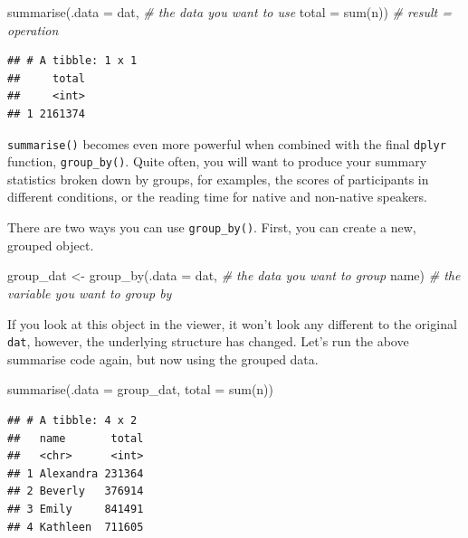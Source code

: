\documentclass[
  oneside]{book}
\newenvironment{Shaded}{\begin{snugshade}}{\end{snugshade}}
\newcommand{\AttributeTok}[1]{\textcolor[rgb]{0.77,0.63,0.00}{#1}}
\newcommand{\CommentTok}[1]{\textcolor[rgb]{0.56,0.35,0.01}{\textit{#1}}}
\newcommand{\FunctionTok}[1]{\textcolor[rgb]{0.00,0.00,0.00}{#1}}
\newcommand{\NormalTok}[1]{#1}
\newcommand{\OtherTok}[1]{\textcolor[rgb]{0.56,0.35,0.01}{#1}}
\begin{document}
\begin{Shaded}
\begin{Highlighting}[]
\FunctionTok{summarise}\NormalTok{(}\AttributeTok{.data =}\NormalTok{ dat, }\CommentTok{\# the data you want to use}
          \AttributeTok{total =} \FunctionTok{sum}\NormalTok{(n)) }\CommentTok{\# result = operation}
\end{Highlighting}
\end{Shaded}

\begin{verbatim}
## # A tibble: 1 x 1
##     total
##     <int>
## 1 2161374
\end{verbatim}

\texttt{summarise()} becomes even more powerful when combined with the final \texttt{dplyr} function, \texttt{group\_by()}. Quite often, you will want to produce your summary statistics broken down by groups, for examples, the scores of participants in different conditions, or the reading time for native and non-native speakers.

There are two ways you can use \texttt{group\_by()}. First, you can create a new, grouped object.

\begin{Shaded}
\begin{Highlighting}[]
\NormalTok{group\_dat }\OtherTok{\textless{}{-}} \FunctionTok{group\_by}\NormalTok{(}\AttributeTok{.data =}\NormalTok{ dat, }\CommentTok{\# the data you want to group}
\NormalTok{                      name) }\CommentTok{\# the variable you want to group by}
\end{Highlighting}
\end{Shaded}

If you look at this object in the viewer, it won't look any different to the original \texttt{dat}, however, the underlying structure has changed. Let's run the above summarise code again, but now using the grouped data.

\begin{Shaded}
\begin{Highlighting}[]
\FunctionTok{summarise}\NormalTok{(}\AttributeTok{.data =}\NormalTok{ group\_dat, }
          \AttributeTok{total =} \FunctionTok{sum}\NormalTok{(n)) }
\end{Highlighting}
\end{Shaded}

\begin{verbatim}
## # A tibble: 4 x 2
##   name       total
##   <chr>      <int>
## 1 Alexandra 231364
## 2 Beverly   376914
## 3 Emily     841491
## 4 Kathleen  711605
\end{verbatim}
\end{document}
